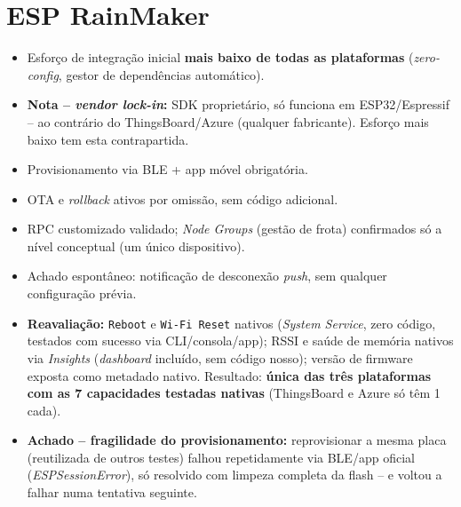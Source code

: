 \documentclass[a4paper,11pt]{article}
\begin{document}
\section{ESP RainMaker}
\begin{itemize}
    \item Esforço de integração inicial \textbf{mais baixo de todas as plataformas} (\textit{zero-config}, gestor de dependências automático).
    \item \textbf{Nota -- \textit{vendor lock-in}:} SDK proprietário, só funciona em ESP32/Espressif -- ao contrário do ThingsBoard/Azure (qualquer fabricante). Esforço mais baixo tem esta contrapartida.
    \item Provisionamento via BLE + app móvel obrigatória.
    \item OTA e \textit{rollback} ativos por omissão, sem código adicional.
    \item RPC customizado validado; \textit{Node Groups} (gestão de frota) confirmados só a nível conceptual (um único dispositivo).
    \item Achado espontâneo: notificação de desconexão \textit{push}, sem qualquer configuração prévia.
    \item \textbf{Reavaliação:} \texttt{Reboot} e \texttt{Wi-Fi Reset} nativos (\textit{System Service}, zero código, testados com sucesso via CLI/consola/app); RSSI e saúde de memória nativos via \textit{Insights} (\textit{dashboard} incluído, sem código nosso); versão de firmware exposta como metadado nativo. Resultado: \textbf{única das três plataformas com as 7 capacidades testadas nativas} (ThingsBoard e Azure só têm 1 cada).
    \item \textbf{Achado -- fragilidade do provisionamento:} reprovisionar a mesma placa (reutilizada de outros testes) falhou repetidamente via BLE/app oficial (\textit{ESPSessionError}), só resolvido com limpeza completa da flash -- e voltou a falhar numa tentativa seguinte.
\end{itemize}

\newpage
\end{document}
